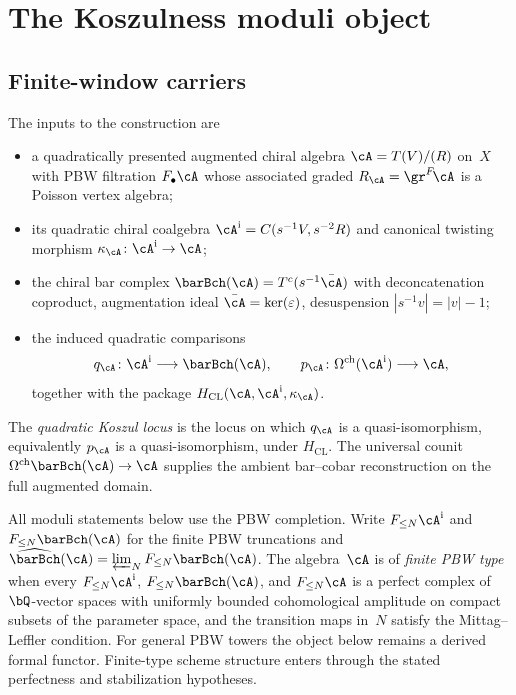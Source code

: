 \section{The Koszulness moduli object}
\label{v1-sec:kms-moduli}

\subsection{Finite-window carriers}

The inputs to the construction are
\begin{itemize}
\item a quadratically presented augmented chiral algebra
 $\cA=T(V)/(R)$ on~$X$ with PBW filtration
 $F_\bullet \cA$ whose associated graded
 $R_\cA = \gr^F\!\cA$ is a Poisson vertex algebra;
\item its quadratic chiral coalgebra
 $\cA^{\mathrm i}=C(s^{-1}V,s^{-2}R)$ and canonical twisting morphism
 $\kappa_\cA\colon\cA^{\mathrm i}\to\cA$;
\item the chiral bar complex
 $\barBch(\cA) = T^c(s^{-1}\bar\cA)$ with deconcatenation
 coproduct, augmentation ideal
 $\bar\cA = \ker(\varepsilon)$, desuspension
 $|s^{-1}v| = |v|-1$;
\item the induced quadratic comparisons
 \[
 q_\cA\colon\cA^{\mathrm i}\longrightarrow\barBch(\cA),
 \qquad
 p_\cA\colon\Omega^{\mathrm{ch}}(\cA^{\mathrm i})
 \longrightarrow\cA,
 \]
 together with the package
 $H_{\mathrm{CL}}(\cA,\cA^{\mathrm i},\kappa_\cA)$.
\end{itemize}

The \emph{quadratic Koszul locus} is the locus on which $q_\cA$ is a
quasi-isomorphism, equivalently $p_\cA$ is a quasi-isomorphism, under
$H_{\mathrm{CL}}$.  The universal counit
$\Omega^{\mathrm{ch}}\barBch(\cA)\to\cA$ supplies the ambient
bar--cobar reconstruction on the full augmented domain.

All moduli statements below use the PBW completion. Write
$F_{\le N}\cA^{\mathrm i}$ and $F_{\le N}\barBch(\cA)$ for the
finite PBW truncations and
$\widehat{\barBch}(\cA)=\varprojlim_N F_{\le N}\barBch(\cA)$.
The algebra~$\cA$ is of \emph{finite PBW type} when every
$F_{\le N}\cA^{\mathrm i}$, $F_{\le N}\barBch(\cA)$, and
$F_{\le N}\cA$ is a perfect complex
of $\bQ$-vector spaces with uniformly bounded cohomological
amplitude on compact subsets of the parameter space, and the
transition maps in~$N$ satisfy the Mittag--Leffler condition.
For general PBW towers the object below remains a derived formal
functor.  Finite-type scheme structure enters through the stated
perfectness and stabilization hypotheses.

